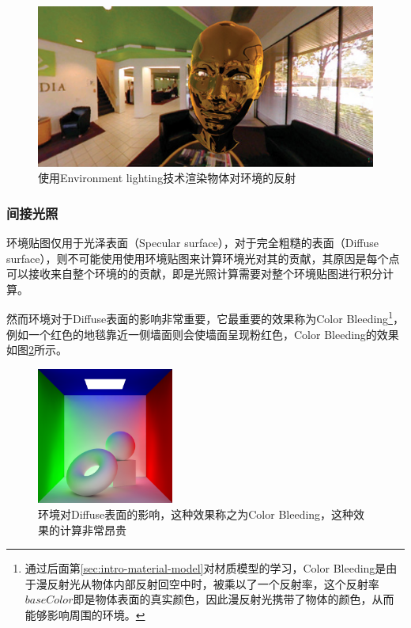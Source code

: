 \begin{figure}
\includegraphics[width=1.\textwidth]{figures/intro/reflection-1}	
\caption{使用Environment lighting技术渲染物体对环境的反射}
\label{f:intro-reflection-2}
\end{figure}




\subsubsection{间接光照}
环境贴图仅用于光泽表面（Specular surface），对于完全粗糙的表面（Diffuse surface），则不可能使用使用环境贴图来计算环境光对其的贡献，其原因是每个点可以接收来自整个环境的的贡献，即是光照计算需要对整个环境贴图进行积分计算。

然而环境对于Diffuse表面的影响非常重要，它最重要的效果称为Color Bleeding\footnote{通过后面第\ref{sec:intro-material-model}对材质模型的学习，Color Bleeding是由于漫反射光从物体内部反射回空中时，被乘以了一个反射率，这个反射率$baseColor$即是物体表面的真实颜色，因此漫反射光携带了物体的颜色，从而能够影响周围的环境。}，例如一个红色的地毯靠近一侧墙面则会使墙面呈现粉红色，Color Bleeding的效果如图\ref{f:intro-indirect}所示。

\begin{figure}
\sidecaption
\includegraphics[width=0.4\textwidth]{figures/intro/indirect}	
\caption{环境对Diffuse表面的影响，这种效果称之为Color Bleeding，这种效果的计算非常昂贵}
\label{f:intro-indirect}
\end{figure}

